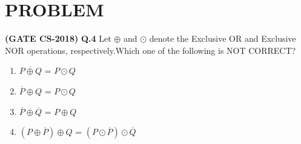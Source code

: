 \documentclass[a4paper,11pt,twocolumn]{article}
\begin{document}
\section{PROBLEM}
\textbf{(GATE CS-2018)}
\textbf{Q.4} Let $\oplus$ and $\odot$ denote the Exclusive OR and Exclusive NOR operations, respectively.Which one of the following is NOT CORRECT?
\begin{enumerate}[label=(\Alph*)]
	\item $\overline{P\oplus Q}$ = $ P \odot Q $
    \item $\overline{P} \oplus Q$ = $ P \odot Q $
    \item $\overline{P} \oplus \overline{Q}$ = $ P \oplus Q $
    \item $(P \oplus \overline{P}) \oplus Q$ = $(P \odot \overline{P}) \odot \overline{Q}$
\end{enumerate}
\end{document}

